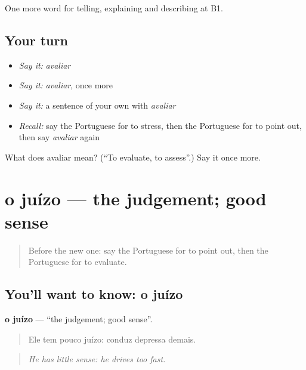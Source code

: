 \begin{grammarlens}[title={What you've built}]
One more word for telling, explaining and describing at B1.
\end{grammarlens}

\subsection*{Your turn}
\begin{itemize}
\raggedright
  \item \emph{Say it:} \emph{avaliar}
  \item \emph{Say it:} \emph{avaliar}, once more
  \item \emph{Say it:} a sentence of your own with \emph{avaliar}
  \item \emph{Recall:} say the Portuguese for to stress, then the Portuguese for to point out, then say \emph{avaliar} again
\end{itemize}

\begin{tcolorbox}[breakable,colback=teal!4,colframe=teal!35!black,title={Before you move on}]
What does avaliar mean? (\textquotedblleft{}To evaluate, to assess\textquotedblright{}.) Say it once more.
\end{tcolorbox}
\section[o juízo]{o juízo — the judgement; good sense}

\label{lesson:PT-C344-juizo}



\begin{quote}
Before the new one: say the Portuguese for to point out, then the Portuguese for to evaluate.
\end{quote}

\subsection*{You'll want to know: o juízo}
\textbf{o juízo} — \textquotedblleft{}the judgement; good sense\textquotedblright{}.

\begin{quote}
Ele tem pouco juízo: conduz depressa demais.
\end{quote}

\begin{quote}
\emph{He has little sense: he drives too fast.}
\end{quote}

